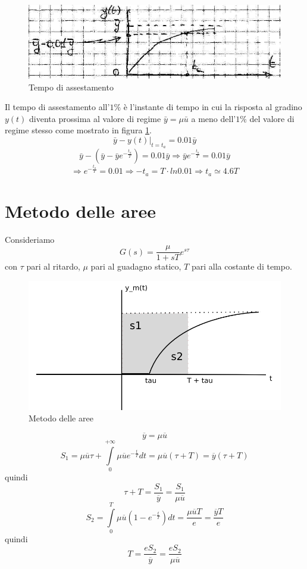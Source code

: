 \documentclass[a4paper]{report}
\begin{document}
\begin{figure}[!h]
  \begin{center}
    \includegraphics[scale=0.5]{./figures/modelliStrutturali04.png}
    \caption{Tempo di assestamento}
    \label{fig:modelliStrutturali04}
  \end{center}
\end{figure}
Il tempo di assestamento all'$1\%$ \`e l'instante di tempo in cui la
risposta al gradino $y(t)$ diventa prossima al valore di regime
$\bar{y} = \mu \bar{u}$ a meno dell'$1\%$ del valore di regime stesso
come mostrato in figura \ref{fig:modelliStrutturali04}.
\[
\left . \bar{y} - y(t) \right |_{t = t_a} = 0.01\bar{y}
\]
\[
\bar{y} - (\bar{y} - \bar{y} e^{-\frac{t_a}{T}}) = 0.01\bar{y}
\Rightarrow \bar{y} e^{-\frac{t_a}{T}} = 0.01\bar{y}
\]
\[
\Rightarrow e^{-\frac{t_a}{T}} = 0.01 \Rightarrow  - t_a = T \cdot ln
0.01 \Rightarrow t_a \simeq 4.6 T
\]
\section{Metodo delle aree}
Consideriamo
\[
G(s) = \dfrac{\mu}{1 + sT} e^{s \tau}
\]
con $\tau$ pari al ritardo, $\mu$ pari al guadagno statico, $T$ pari
alla costante di tempo.
\begin{figure}[!h]
  \begin{center}
    \includegraphics[scale=0.4]{./images/metodoDelleAree}
    \caption{Metodo delle aree}
    \label{fig:metodoDelleAree}
  \end{center}
\end{figure}
\[
\overline{y} = \mu \overline{u}
\]
\[
S_1 = \mu \overline{u} \tau + \int\limits_{0}^{+ \infty} \mu
\overline{u}e^{-\frac{t}{T}} dt = \mu \overline{u}(\tau + T) =
\overline{y}(\tau + T)
\]
quindi
\[
\tau + T = \dfrac{S_1}{\overline{y}} = \dfrac{S_1}{\mu \overline{u}}
\]
\[
S_2 = \int\limits_{0}^{T} \mu \overline{u} (1 - e^{- \frac{t}{T}}) dt
= \dfrac{\mu \overline{u} T}{e} = \dfrac{\overline{y} T}{e}
\]
quindi
\[
T = \dfrac{e S_2}{\overline{y}} = \dfrac{e S_2}{\mu \overline{u}}
\]
\end{document}
